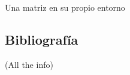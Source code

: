 \documentclass[12pt, a4paper, titlepage]{article}
\begin{document}
  Una matriz en su propio entorno


  \newpage
  \begin{appendices}
    \makeatletter

    \section{Bibliografía}

    (All the info)

  \end{appendices}
\end{document}
